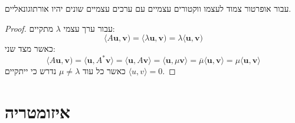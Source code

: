 \documentclass{tstextbook}
\begin{document}
\begin{proposition}
עבור אופרטור צמוד לעצמו ווקטורים עצמיים עם ערכים עצמיים שונים יהיו אורתוגונאליים.

\end{proposition}
\begin{proof}
עבור ערך עצמי \(\lambda\) מתקיים:
$$ \langle A\mathbf{u},\mathbf{v})=\langle\lambda\mathbf{u},\mathbf{v})=\lambda\langle\mathbf{u},\mathbf{v})$$
כאשר מצד שני:
$$\langle A\mathbf{u},\mathbf{v})=\langle\mathbf{u},A^{*}\mathbf{v} \rangle =\langle\mathbf{u},A\mathbf{v} \rangle =\langle\mathbf{u},\mu\mathbf{v} \rangle ={\overline{{\mu}}}\langle\mathbf{u},\mathbf{v} \rangle =\mu\langle\mathbf{u},\mathbf{v} \rangle $$
כאשר כל עוד \(\mu \neq \lambda\) נדרש כי ייתקיים \(\langle u,v \rangle=0\).

\end{proof}
\section{איזומטריה}
\end{document}
